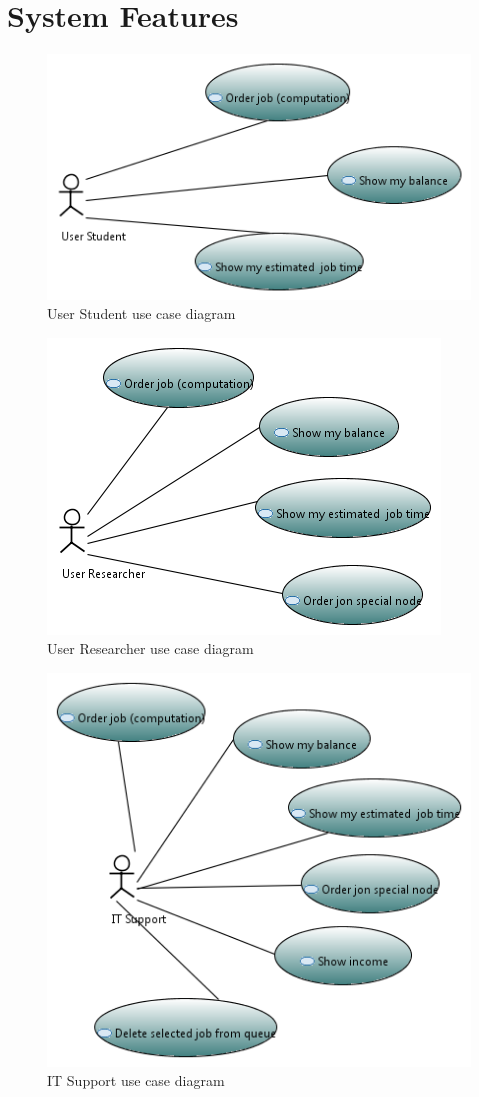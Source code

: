 \documentclass{scrreprt}
\begin{document}
\chapter{System Features}


\begin{figure}[h!]
\centering
\includegraphics{modelStudent.png}
\caption{User Student use case diagram}
\end{figure}


\begin{figure}[h!]
\centering
\includegraphics{modelResearcher.png}
\caption{User Researcher use case diagram}
\end{figure}


\begin{figure}[h!]
\centering
\includegraphics{modelIT.png}
\caption{IT Support use case diagram}
\end{figure}
\end{document}
